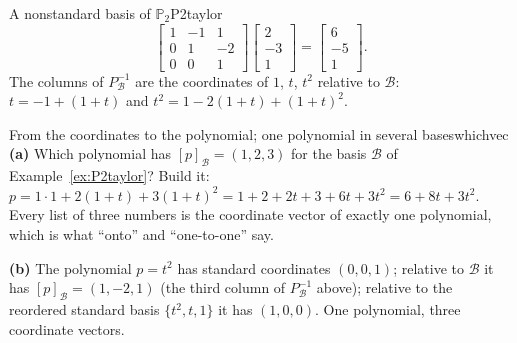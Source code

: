 \documentclass[11pt]{article}
\begin{document}
\begin{exmp}{A nonstandard basis of $\mathbb{P}_2$}{P2taylor}
\[\begin{bmatrix}1&-1&1\\0&1&-2\\0&0&1\end{bmatrix}\begin{bmatrix}2\\-3\\1\end{bmatrix}=\begin{bmatrix}6\\-5\\1\end{bmatrix}.
\]
The columns of $P_{\mathcal{B}}^{-1}$ are the coordinates of $1$, $t$, $t^2$ relative to $\mathcal{B}$: $t=-1+(1+t)$ and $t^2=1-2(1+t)+(1+t)^2$.
\end{exmp}

\begin{exmp}{From the coordinates to the polynomial; one polynomial in several bases}{whichvec}
\textbf{(a)} Which polynomial has $[p]_{\mathcal{B}}=(1,2,3)$ for the basis $\mathcal{B}$ of Example~\ref{ex:P2taylor}? Build it: $p=1\cdot1+2(1+t)+3(1+t)^2=1+2+2t+3+6t+3t^2=6+8t+3t^2$. Every list of three numbers is the coordinate vector of exactly one polynomial, which is what ``onto'' and ``one-to-one'' say.

\textbf{(b)} The polynomial $p=t^2$ has standard coordinates $(0,0,1)$; relative to $\mathcal{B}$ it has $[p]_{\mathcal{B}}=(1,-2,1)$ (the third column of $P_{\mathcal{B}}^{-1}$ above); relative to the reordered standard basis $\{t^2,t,1\}$ it has $(1,0,0)$. One polynomial, three coordinate vectors.
\end{exmp}
\end{document}
